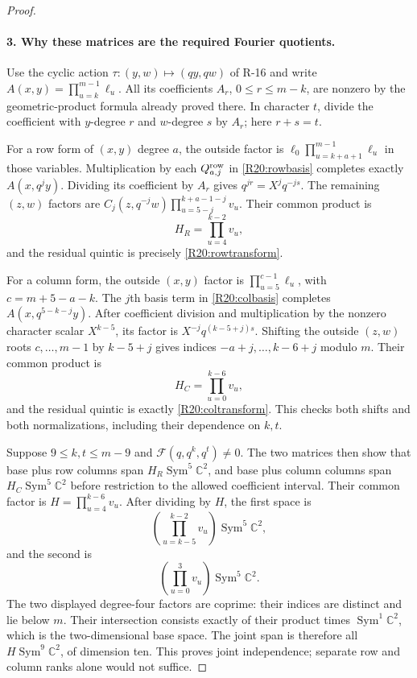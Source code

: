 \begin{proof}
\paragraph{3. Why these matrices are the required Fourier quotients.}
Use the cyclic action $\tau:(y,w)\mapsto(qy,qw)$ of R-16 and
write $A(x,y)=\prod_{u=k}^{m-1}\ell_u$.
All its coefficients $A_r$, $0\leq r\leq m-k$, are nonzero by
the geometric-product formula already proved there. In character
$t$, divide the coefficient with $y$-degree $r$ and $w$-degree
$s$ by $A_r$; here $r+s=t$.

For a row form of $(x,y)$ degree $a$, the outside factor is
$\ell_0\prod_{u=k+a+1}^{m-1}\ell_u$ in those variables.
Multiplication by each $Q^{\rm row}_{a,j}$ in
\eqref{R20:rowbasis} completes exactly $A(x,q^jy)$.
Dividing its coefficient by $A_r$ gives $q^{jr}=X^jq^{-js}$.
The remaining $(z,w)$ factors are
$C_j(z,q^{-j}w)\prod_{u=5-j}^{k+a-1-j}v_u$.
Their common product is
\[
 H_R=\prod_{u=4}^{k-2}v_u,
\]
and the residual quintic is precisely
\eqref{R20:rowtransform}.

For a column form, the outside $(x,y)$ factor is
$\prod_{u=5}^{c-1}\ell_u$, with $c=m+5-a-k$.
The $j$th basis term in \eqref{R20:colbasis} completes
$A(x,q^{5-k-j}y)$. After coefficient division and multiplication
by the nonzero character scalar $X^{k-5}$, its factor is
$X^{-j}q^{(k-5+j)s}$.
Shifting the outside $(z,w)$ roots $c,\ldots,m-1$ by
$k-5+j$ gives indices $-a+j,\ldots,k-6+j$ modulo $m$.
Their common product is
\[
 H_C=\prod_{u=0}^{k-6}v_u,
\]
and the residual quintic is exactly
\eqref{R20:coltransform}. This checks both shifts and both
normalizations, including their dependence on $k,t$.

Suppose $9\leq k,t\leq m-9$ and
$\mathscr F(q,q^k,q^t)\ne0$. The two matrices then show that
base plus row columns span $H_R\operatorname{Sym}^5\mathbb C^2$,
and base plus column columns span
$H_C\operatorname{Sym}^5\mathbb C^2$ before restriction to the
allowed coefficient interval. Their common factor is
$H=\prod_{u=4}^{k-6}v_u$. After dividing by $H$, the first space is
\[
 \left(\prod_{u=k-5}^{k-2}v_u\right)
                 \operatorname{Sym}^5\mathbb C^2,
\]
and the second is
\[
 \left(\prod_{u=0}^{3}v_u\right)
                 \operatorname{Sym}^5\mathbb C^2.
\]
The two displayed degree-four factors are coprime: their indices
are distinct and lie below $m$. Their intersection consists exactly
of their product times $\operatorname{Sym}^1\mathbb C^2$,
which is the two-dimensional base space. The joint span is therefore
all $H\operatorname{Sym}^9\mathbb C^2$, of dimension ten.
This proves joint independence; separate row and column ranks alone
would not suffice.


\end{proof}
